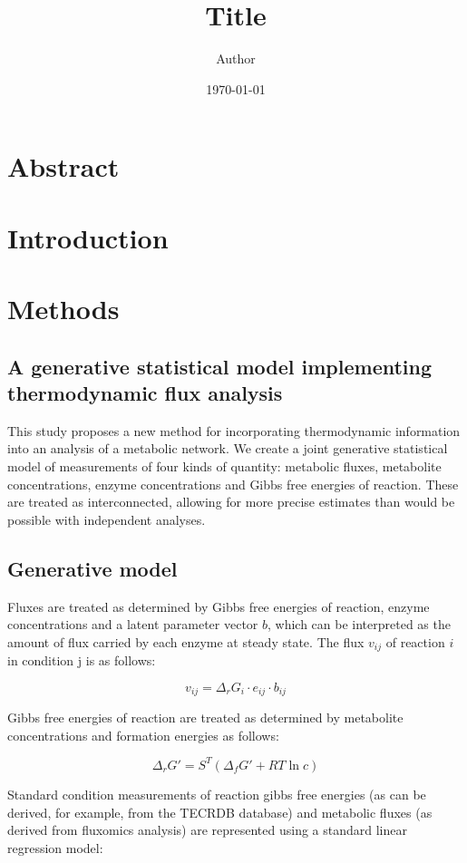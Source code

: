 \documentclass[11pt]{article}
\title{ Title}
\author{ Author }
\date{\today}
\begin{document}
	\maketitle	
	\pagebreak
	

\section{Abstract}

\section{Introduction}

\section{Methods}	
\subsection{A generative statistical model implementing thermodynamic flux analysis}

This study proposes a new method for incorporating thermodynamic information
into an analysis of a metabolic network. We create a joint generative
statistical model of measurements of four kinds of quantity: metabolic fluxes,
metabolite concentrations, enzyme concentrations and Gibbs free energies of
reaction. These are treated as interconnected, allowing for more precise
estimates than would be possible with independent analyses.

\subsection{Generative model}

Fluxes are treated as determined by Gibbs free energies of reaction, enzyme
concentrations and a latent parameter vector $b$, which can be interpreted as
the amount of flux carried by each enzyme at steady state. The flux $v_{ij}$ of
reaction $i$ in condition {j} is as follows:

$$
v_{ij} = \Delta_rG_i \cdot e_{ij} \cdot b_{ij}
$$

Gibbs free energies of reaction are treated as determined by metabolite
concentrations and formation energies as follows:

$$
\Delta_rG' = S^T(\Delta_fG' + RT\ln c)
$$

Standard condition measurements of reaction gibbs free energies (as can be
derived, for example, from the TECRDB database) and metabolic fluxes (as
derived from fluxomics analysis) are represented using a standard linear
regression model:
\end{document}
